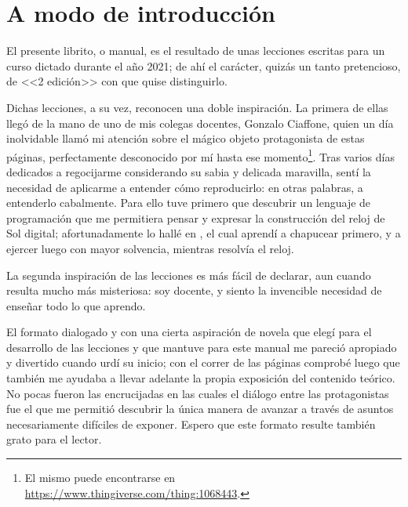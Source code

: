\chapter{A modo de introducción}

El presente librito, o manual, es el resultado de unas lecciones
escritas para un curso dictado durante el año 2021; de ahí el
carácter, quizás un tanto pretencioso, de <<2 edición>> con
que quise distinguirlo.

Dichas lecciones, a su vez, reconocen una doble inspiración. La
primera de ellas llegó de la mano de uno de mis colegas docentes,
Gonzalo Ciaffone, quien un día inolvidable llamó mi atención sobre el
mágico objeto protagonista de estas páginas, perfectamente desconocido
por mí hasta ese momento\footnote{El mismo puede encontrarse en
  \url{https://www.thingiverse.com/thing:1068443}.}. Tras varios días
dedicados a regocijarme considerando su sabia y delicada maravilla,
sentí la necesidad de aplicarme a entender cómo reproducirlo: en otras
palabras, a entenderlo cabalmente. Para ello tuve primero que
descubrir un lenguaje de programación que me permitiera pensar y
expresar la construcción del reloj de Sol digital; afortunadamente lo
hallé en \openscad, el cual aprendí a chapucear primero, y a ejercer
luego con mayor solvencia, mientras resolvía el reloj.

La segunda inspiración de las lecciones es más fácil de declarar, aun
cuando resulta mucho más misteriosa: soy docente, y siento la
invencible necesidad de enseñar todo lo que aprendo.

El formato dialogado y con una cierta aspiración de novela que elegí
para el desarrollo de las lecciones y que mantuve para este manual me
pareció apropiado y divertido cuando urdí su inicio; con el correr de
las páginas comprobé luego que también me ayudaba a llevar adelante la
propia exposición del contenido teórico. No pocas fueron las
encrucijadas en las cuales el diálogo entre las protagonistas fue el
que me permitió descubrir la única manera de avanzar a través de
asuntos necesariamente difíciles de exponer. Espero que este formato
resulte también grato para el lector.

